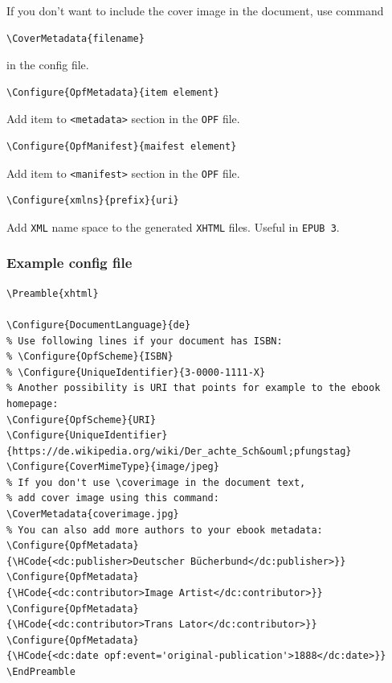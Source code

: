 If you don't want to include the cover image in the document, use
command

\begin{verbatim}
\CoverMetadata{filename}
\end{verbatim}

in the config file.

\begin{verbatim}
\Configure{OpfMetadata}{item element}
\end{verbatim}

Add item to \texttt{\textless{}metadata\textgreater{}} section in the
\texttt{OPF} file.

\begin{verbatim}
\Configure{OpfManifest}{maifest element}
\end{verbatim}

Add item to \texttt{\textless{}manifest\textgreater{}} section in the
\texttt{OPF} file.

\begin{verbatim}
\Configure{xmlns}{prefix}{uri}
\end{verbatim}

Add \texttt{XML} name space to the generated \texttt{XHTML} files.
Useful in \texttt{EPUB\ 3}.

\hypertarget{example-config-file}{%
\subsubsection{Example config file}\label{example-config-file}}

\begin{verbatim}
\Preamble{xhtml}

\Configure{DocumentLanguage}{de}
% Use following lines if your document has ISBN:
% \Configure{OpfScheme}{ISBN}
% \Configure{UniqueIdentifier}{3-0000-1111-X}
% Another possibility is URI that points for example to the ebook homepage:
\Configure{OpfScheme}{URI}
\Configure{UniqueIdentifier}
{https://de.wikipedia.org/wiki/Der_achte_Sch&ouml;pfungstag}
\Configure{CoverMimeType}{image/jpeg}
% If you don't use \coverimage in the document text, 
% add cover image using this command:
\CoverMetadata{coverimage.jpg}
% You can also add more authors to your ebook metadata:
\Configure{OpfMetadata}
{\HCode{<dc:publisher>Deutscher Bücherbund</dc:publisher>}}
\Configure{OpfMetadata}
{\HCode{<dc:contributor>Image Artist</dc:contributor>}}
\Configure{OpfMetadata}
{\HCode{<dc:contributor>Trans Lator</dc:contributor>}}
\Configure{OpfMetadata}
{\HCode{<dc:date opf:event='original-publication'>1888</dc:date>}}
\EndPreamble
\end{verbatim}


